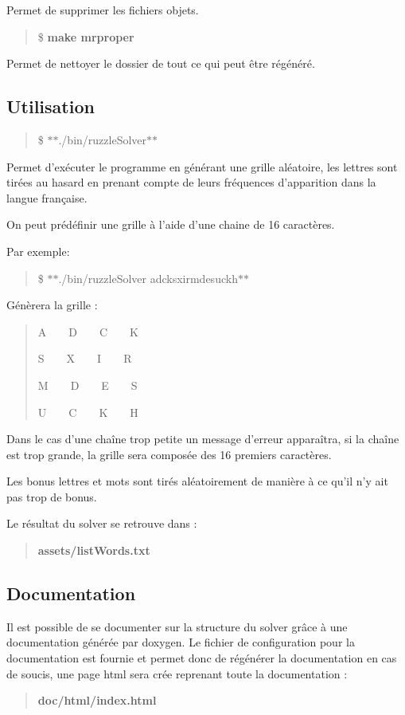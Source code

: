 Permet de supprimer les fichiers objets.

\begin{quote}
\$ {\bfseries make mrproper} \end{quote}


Permet de nettoyer le dossier de tout ce qui peut être régénéré.

\subsection*{Utilisation}

\begin{quote}
\$ $\ast$$\ast$./bin/ruzzle\+Solver$\ast$$\ast$ \end{quote}


Permet d'exécuter le programme en générant une grille aléatoire, les lettres sont tirées au hasard en prenant compte de leurs fréquences d'apparition dans la langue française.

On peut prédéfinir une grille à l'aide d'une chaine de 16 caractères.

Par exemple\+:

\begin{quote}
\$ $\ast$$\ast$./bin/ruzzle\+Solver adcksxirmdesuckh$\ast$$\ast$ \end{quote}


Génèrera la grille \+:

\begin{quote}
A~~~~D~~~~C~~~~K

S~~~~X~~~~I~~~~R

M~~~~D~~~~E~~~~S

U~~~~C~~~~K~~~~H

\end{quote}


Dans le cas d'une chaîne trop petite un message d'erreur apparaîtra, si la chaîne est trop grande, la grille sera composée des 16 premiers caractères.

Les bonus lettres et mots sont tirés aléatoirement de manière à ce qu'il n'y ait pas trop de bonus.

Le résultat du solver se retrouve dans \+:

\begin{quote}
{\bfseries assets/list\+Words.\+txt} \end{quote}


\subsection*{Documentation}

Il est possible de se documenter sur la structure du solver grâce à une documentation générée par doxygen. Le fichier de configuration pour la documentation est fournie et permet donc de régénérer la documentation en cas de soucis, une page html sera crée reprenant toute la documentation \+:

\begin{quote}
{\bfseries doc/html/index.\+html}\end{quote}
